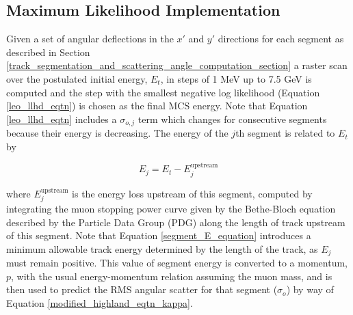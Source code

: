\documentclass[a4paper,11pt]{article}
\begin{document}











\subsection{Maximum Likelihood Implementation}\label{maximum_likelihood_section}

Given a set of angular deflections in the $x'$ and $y'$ directions for each segment as described in Section \ref{track_segmentation_and_scattering_angle_computation_section} a raster scan over the postulated initial energy, $E_t$, in steps of 1 MeV up to 7.5 GeV is computed and the step with the smallest negative log likelihood (Equation \ref{leo_llhd_eqtn}) is chosen as the final MCS energy. Note that Equation \ref{leo_llhd_eqtn} includes a $\sigma_{o,j}$ term which changes for consecutive segments because their energy is decreasing. The energy of the $j$th segment is related to $E_t$ by

\begin{equation}\label{segment_E_equation}
E_{j} = E_t - E^{\text{upstream}}_{j}
\end{equation}

where $E^{\text{upstream}}_{j}$ is the energy loss upstream of this segment, computed by integrating the muon stopping power curve given by the Bethe-Bloch equation described by the Particle Data Group (PDG) \cite{stoppingpowersource} along the length of track upstream of this segment. Note that Equation \ref{segment_E_equation} introduces a minimum allowable track energy determined by the length of the track, as $E_{j}$ must remain positive. This value of segment energy is converted to a momentum, $p$, with the usual energy-momentum relation assuming the muon mass, and is then used to predict the RMS angular scatter for that segment ($\sigma_o$) by way of Equation \ref{modified_highland_eqtn_kappa}. 
\end{document}
